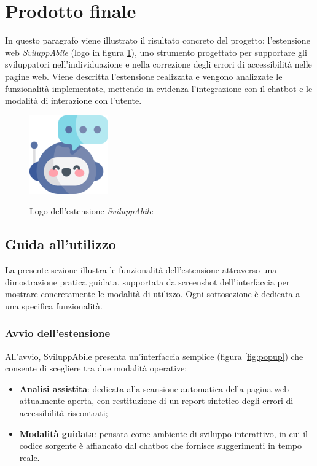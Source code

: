 \section{Prodotto finale}
\noindent In questo paragrafo viene illustrato il risultato concreto del progetto: l’estensione web \textit{SviluppAbile} (logo in figura \ref{fig:logo_sviluppabile}), uno strumento progettato per supportare gli sviluppatori nell’individuazione e nella correzione degli errori di accessibilità nelle pagine web. Viene descritta l’estensione realizzata e vengono analizzate le funzionalità implementate, mettendo in evidenza l’integrazione con il chatbot e le modalità di interazione con l’utente.

\begin{figure}[H]
    \centering
    \includegraphics[width=0.15\linewidth, alt={Logo dell'estensione \textit{SviluppAbile}}]{img/sviluppabile.png}
    \caption{Logo dell'estensione \textit{SviluppAbile}}\label{fig:logo_sviluppabile}
\end{figure}

\subsection{Guida all'utilizzo}
\noindent La presente sezione illustra le funzionalità dell’estensione attraverso una dimostrazione pratica guidata, supportata da screenshot dell’interfaccia per mostrare concretamente le modalità di utilizzo. Ogni sottosezione è dedicata a una specifica funzionalità.

\subsubsection{Avvio dell'estensione}
\noindent All’avvio, SviluppAbile presenta un’interfaccia semplice (figura \ref{fig:popup}) che consente di scegliere tra due modalità operative:
\begin{itemize}
  \item \textbf{Analisi assistita}: dedicata alla scansione automatica della pagina web attualmente aperta, con restituzione di un report sintetico degli errori di accessibilità riscontrati;
  \item \textbf{Modalità guidata}: pensata come ambiente di sviluppo interattivo, in cui il codice sorgente è affiancato dal chatbot che fornisce suggerimenti in tempo reale.
\end{itemize}

